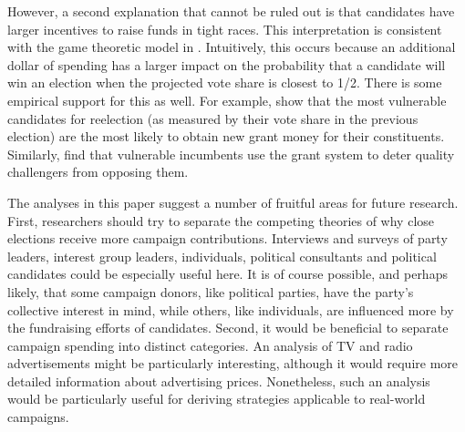 \documentclass[12pt,final,fleqn]{article}
\theoremstyle{plain}
\begin{document}
However, a second explanation that cannot be ruled out is that candidates have larger incentives to raise funds in tight races. This interpretation is consistent with the game theoretic model in \citet{erikson2000equilibria}. Intuitively, this occurs because an additional dollar of spending has a larger impact on the probability that a candidate will win an election when the projected vote share is closest to 1/2. There is some empirical support for this as well. For example, \citet{stein1994congressional} show that the most vulnerable candidates for reelection (as measured by their vote share in the previous election) are the most likely to obtain new grant money for their constituents. Similarly, \citet{bickers1996electoral} find that vulnerable incumbents use the grant system to deter quality challengers from opposing them.

The analyses in this paper suggest a number of fruitful areas for future research. First, researchers should try to separate the competing theories of why close elections receive more campaign contributions. Interviews and surveys of party leaders, interest group leaders, individuals, political consultants and political candidates could be especially useful here. It is of course possible, and perhaps likely, that some campaign donors, like political parties, have the party's collective interest in mind, while others, like individuals, are influenced more by the fundraising efforts of candidates.  Second, it would be beneficial to separate campaign spending into distinct categories. An analysis of TV and radio advertisements might be particularly interesting, although it would require more detailed information about advertising prices. Nonetheless, such an analysis would be particularly useful for deriving strategies applicable to real-world campaigns.



\end{document}
